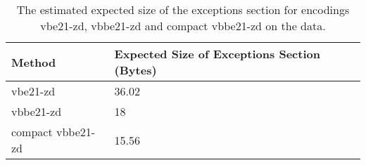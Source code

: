 \begin{table}
    \caption{\label{tab:ex-sec-exp} The estimated expected size of the
	exceptions section for encodings vbe21-zd, vbbe21-zd and compact
	vbbe21-zd on the data.}
	\begin{tabular}{|l|m{4.5cm}|}
        \hline
Method & Expected Size of Exceptions Section (Bytes)\\
        \hline
vbe21-zd & 36.02\\
vbbe21-zd & 18\\
compact vbbe21-zd & 15.56\\
	\hline
    \end{tabular}
\end{table}
